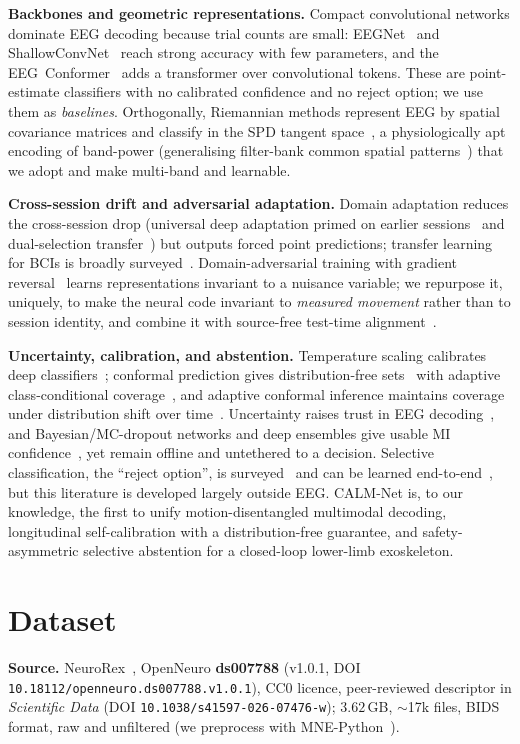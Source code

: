 \documentclass[journal]{IEEEtran}
\begin{document}
\textbf{Backbones and geometric representations.} Compact convolutional networks
dominate EEG decoding because trial counts are small: EEGNet~\cite{lawhern2018} and
ShallowConvNet~\cite{schirrmeister2017} reach strong accuracy with few parameters,
and the EEG~Conformer~\cite{song2023} adds a transformer over convolutional tokens.
These are point-estimate classifiers with no calibrated confidence and no reject
option; we use them as \emph{baselines}. Orthogonally, Riemannian methods represent
EEG by spatial covariance matrices and classify in the SPD tangent
space~\cite{barachant2012, congedo2017, yger2017}, a physiologically apt encoding of
band-power (generalising filter-bank common spatial patterns~\cite{ang2012}) that we
adopt and make multi-band and learnable.

\textbf{Cross-session drift and adversarial adaptation.} Domain adaptation reduces
the cross-session drop (universal deep adaptation primed on earlier
sessions~\cite{zhang2023} and dual-selection transfer~\cite{luo2023}) but outputs
forced point predictions; transfer learning for BCIs is broadly
surveyed~\cite{jayaram2016}. Domain-adversarial training with gradient
reversal~\cite{ganin2016} learns representations invariant to a nuisance variable; we
repurpose it, uniquely, to make the neural code invariant to \emph{measured movement}
rather than to session identity, and combine it with source-free test-time
alignment~\cite{sun2016}.

\textbf{Uncertainty, calibration, and abstention.} Temperature scaling calibrates
deep classifiers~\cite{guo2017}; conformal prediction gives distribution-free
sets~\cite{vovk2005, angelopoulos2023} with adaptive class-conditional
coverage~\cite{romano2020}, and adaptive conformal inference maintains coverage
under distribution shift over time~\cite{gibbs2021}. Uncertainty raises trust in EEG
decoding~\cite{tveter2024}, and Bayesian/MC-dropout networks and deep ensembles give
usable MI confidence~\cite{milanes2023,gal2016,lakshminarayanan2017}, yet remain
offline and untethered to a decision. Selective classification, the ``reject
option'', is surveyed~\cite{hendrickx2024} and can be learned
end-to-end~\cite{geifman2017, geifman2019}, but
this literature is developed largely outside EEG. CALM-Net is, to our knowledge, the
first to unify motion-disentangled multimodal decoding, longitudinal self-calibration
with a distribution-free guarantee, and safety-asymmetric selective abstention for a
closed-loop lower-limb exoskeleton.

\section{Dataset}\label{sec:data}
\textbf{Source.} NeuroRex~\cite{sarkar2026}, OpenNeuro \textbf{ds007788} (v1.0.1, DOI
\texttt{10.18112/openneuro.ds007788.v1.0.1}), CC0 licence, peer-reviewed descriptor
in \emph{Scientific Data} (DOI \texttt{10.1038/s41597-026-07476-w}); $3.62$\,GB,
$\sim$17k files, BIDS format, raw and unfiltered (we preprocess with
MNE-Python~\cite{gramfort2014}).
\end{document}
